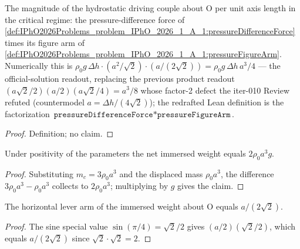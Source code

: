 \begin{definition}
\label{def:IPhO2026Problems_problem_IPhO_2026_1_A_1:pressureCoupleMagnitude}
The magnitude of the hydrostatic driving couple about O per unit axis
length in the critical regime: the pressure-difference force of
\cref{def:IPhO2026Problems_problem_IPhO_2026_1_A_1:pressureDifferenceForce}
times its figure arm of
\cref{def:IPhO2026Problems_problem_IPhO_2026_1_A_1:pressureFigureArm}.
Numerically this is $\rho_0 g\, \Delta h \cdot (a^2/\sqrt{2}) \cdot
(a/(2\sqrt{2})) = \rho_0 g\, \Delta h\, a^3/4$ --- the official-solution
readout, replacing the previous product readout
$(a\sqrt{2}/2)(a/2)(a\sqrt{2}/4) = a^3/8$ whose factor-2 defect the
iter-010 Review refuted (countermodel $a = \Delta h/(4\sqrt{2})$); the
redrafted Lean definition is the factorization
$\texttt{pressureDifferenceForce} * \texttt{pressureFigureArm}$.
\end{definition}
\begin{proof}
Definition; no claim.
\end{proof}

\begin{lemma}
\label{lem:IPhO2026Problems_problem_IPhO_2026_1_A_1:net_immersed_weight_eq}
Under positivity of the parameters the net immersed weight equals
$2\rho_0 a^3 g$.
\end{lemma}
\begin{proof}
Substituting $m_c = 3\rho_0 a^3$ and the displaced mass $\rho_0 a^3$, the
difference $3\rho_0 a^3 - \rho_0 a^3$ collects to $2\rho_0 a^3$; multiplying
by $g$ gives the claim.
\end{proof}

\begin{lemma}
\label{lem:IPhO2026Problems_problem_IPhO_2026_1_A_1:weight_lever_arm_eq}
The horizontal lever arm of the immersed weight about O equals
$a/(2\sqrt{2})$.
\end{lemma}
\begin{proof}
The sine special value $\sin(\pi/4) = \sqrt{2}/2$ gives
$(a/2)(\sqrt{2}/2)$, which equals $a/(2\sqrt{2})$ since
$\sqrt{2}\cdot\sqrt{2} = 2$.
\end{proof}


